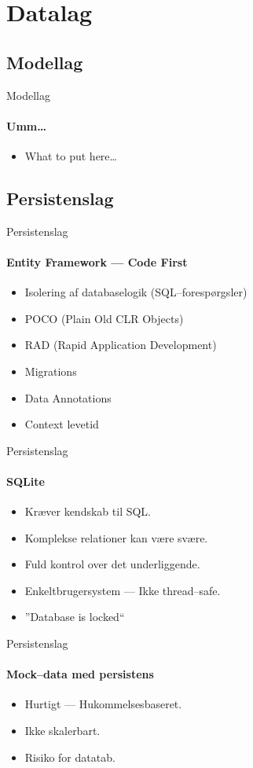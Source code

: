 \section{Datalag}



\subsection{Modellag}

\begin{frame}{Modellag}
  \framesubtitle{Umm\ldots}
  \begin{itemize}
    \item<1-> What to put here\ldots
  \end{itemize}
\end{frame}


\subsection{Persistenslag}

\begin{frame}{Persistenslag}
  \framesubtitle{Entity Framework --- Code First}
  \begin{itemize}
    \item<1-> \color{positivegreen}Isolering af databaselogik (SQL--forespørgsler)
    \item<1-> \color{positivegreen}POCO (Plain Old CLR Objects)
    \item<1-> \color{positivegreen}RAD (Rapid Application Development)
    \item<2-> \color{negativeyellow}Migrations
    \item<2-> \color{negativeyellow}Data Annotations
    \item<3-> \color{badred}Context levetid
  \end{itemize}
\end{frame}

\begin{frame}{Persistenslag}
  \framesubtitle{SQLite}
  \begin{itemize}
    \item<1-> \color{positivegreen}Kræver kendskab til SQL.
    \item<1-> \color{positivegreen}Komplekse relationer kan være svære.
    \item<1-> \color{negativeyellow}Fuld kontrol over det underliggende.
    \item<2-> \color{negativeyellow}Enkeltbrugersystem --- Ikke thread--safe.
    \item<3-> \color{badred}''Database is locked``
  \end{itemize}
\end{frame}

\begin{frame}{Persistenslag}
  \framesubtitle{Mock--data med persistens}
  \begin{itemize}
    \item<1-> \color{positivegreen}Hurtigt --- Hukommelsesbaseret.
    \item<1-> \color{negativeyellow}Ikke skalerbart.
    \item<1-> \color{negativeyellow}Risiko for datatab.
  \end{itemize}
\end{frame}